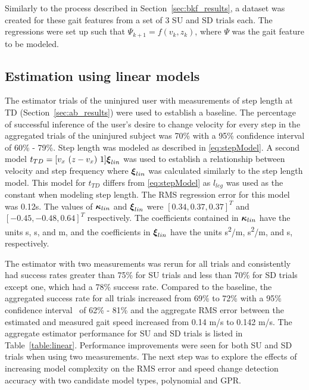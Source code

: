 Similarly to the process described in Section~\ref{sec:bkf_results}, a dataset was created for these gait features from a set of 3 SU and SD trials each. The regressions were set up such that $ \Psi_{k+1} = f(v_k,z_k) $, where $ \Psi $ was the gait feature to be modeled.

\subsection{Estimation using linear models}\label{sec:linear}

The estimator trials of the uninjured user with measurements of step length at TD (Section~\ref{sec:ab_results}) were used to establish a baseline. The percentage of successful inference of the user's desire to change velocity for every step in the aggregated trials of the uninjured subject was 70\% with a 95\% confidence interval of 60\% - 79\%. Step length was modeled as described in \eqref{eq:stepModel}. A second model $t_{TD} =  [v_x\ (z - v_x)\ 1] \boldsymbol{\xi}_{lin}$ was used to establish a relationship between velocity and step frequency where $ \boldsymbol{\xi}_{lin} $ was calculated similarly to the step length model. This model for $ t_{TD} $ differs from \eqref{eq:stepModel} as $ l_{leg} $ was used as the constant when modeling step length. The RMS regression error for this model was 0.12s. The values of $ \boldsymbol{\kappa}_{lin} $ and $ \boldsymbol{\xi}_{lin} $ were $[0.34 ,0.37 ,0.37]^T$ and $ [-0.45 ,-0.48 ,0.64]^T $ respectively. The coefficients contained in $ \boldsymbol{\kappa}_{lin} $ have the units s, s, and m, and the coefficients in $ \boldsymbol{\xi}_{lin} $ have the units s\textsuperscript{2}/m, s\textsuperscript{2}/m, and s, respectively.

The estimator with two measurements was rerun for all trials and consistently had success rates greater than 75\% for SU trials and less than 70\% for SD trials except one, which had a 78\% success rate. Compared to the baseline, the aggregated success rate for all trials increased from 69\% to  72\% with a 95\% confidence interval~\cite{brown2001interval} of 62\% - 81\% and the aggregate RMS error between the estimated and measured gait speed increased from 0.14 m/s to 0.142 m/s. The aggregate estimator performance for SU and SD trials is listed in Table~\ref{table:linear}. Performance improvements were seen for both SU and SD trials when using two measurements. The next step was to explore the effects of increasing model complexity on the RMS error and speed change detection accuracy with two candidate model types, polynomial and GPR.


